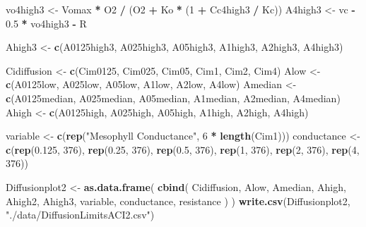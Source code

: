\documentclass[
]{krantz}
\makeatletter
\newenvironment{Shaded}{\begin{snugshade}}{\end{snugshade}}
\newcommand{\DecValTok}[1]{\textcolor[rgb]{0.00,0.00,0.81}{#1}}
\newcommand{\FloatTok}[1]{\textcolor[rgb]{0.00,0.00,0.81}{#1}}
\newcommand{\KeywordTok}[1]{\textcolor[rgb]{0.13,0.29,0.53}{\textbf{#1}}}
\newcommand{\NormalTok}[1]{#1}
\newcommand{\OperatorTok}[1]{\textcolor[rgb]{0.81,0.36,0.00}{\textbf{#1}}}
\newcommand{\StringTok}[1]{\textcolor[rgb]{0.31,0.60,0.02}{#1}}
\newenvironment{kframe}{%
\medskip{}
\setlength{\fboxsep}{.8em}
 \def\at@end@of@kframe{}%
 \ifinner\ifhmode%
  \def\at@end@of@kframe{\end{minipage}}%
  \begin{minipage}{\columnwidth}%
 \fi\fi%
 \def\FrameCommand##1{\hskip\@totalleftmargin \hskip-\fboxsep
 \colorbox{shadecolor}{##1}\hskip-\fboxsep
     \hskip-\linewidth \hskip-\@totalleftmargin \hskip\columnwidth}%
 \MakeFramed {\advance\hsize-\width
   \@totalleftmargin\z@ \linewidth\hsize
   \@setminipage}}%
 {\par\unskip\endMakeFramed%
 \at@end@of@kframe}
\renewenvironment{Shaded}{\begin{kframe}}{\end{kframe}}
\makeatother
\begin{document}
\begin{Shaded}
\begin{Highlighting}[]
\NormalTok{vo4high3 \textless{}{-}}\StringTok{ }\NormalTok{Vomax }\OperatorTok{*}\StringTok{ }\NormalTok{O2 }\OperatorTok{/}\StringTok{ }\NormalTok{(O2 }\OperatorTok{+}\StringTok{ }\NormalTok{Ko }\OperatorTok{*}\StringTok{ }\NormalTok{(}\DecValTok{1} \OperatorTok{+}\StringTok{ }\NormalTok{Cc4high3 }\OperatorTok{/}\StringTok{ }\NormalTok{Kc)) }
\NormalTok{A4high3 \textless{}{-}}\StringTok{ }\NormalTok{vc }\OperatorTok{{-}}\StringTok{ }\FloatTok{0.5} \OperatorTok{*}\StringTok{ }\NormalTok{vo4high3 }\OperatorTok{{-}}\StringTok{ }\NormalTok{R }

\NormalTok{Ahigh3 \textless{}{-}}
\StringTok{  }\KeywordTok{c}\NormalTok{(A0125high3, A025high3, A05high3, A1high3, A2high3, A4high3)}

\NormalTok{Cidiffusion \textless{}{-}}\StringTok{ }\KeywordTok{c}\NormalTok{(Cim0125, Cim025, Cim05, Cim1, Cim2, Cim4)}
\NormalTok{Alow \textless{}{-}}\StringTok{ }\KeywordTok{c}\NormalTok{(A0125low, A025low, A05low, A1low, A2low, A4low)}
\NormalTok{Amedian \textless{}{-}}
\StringTok{  }\KeywordTok{c}\NormalTok{(A0125median,}
\NormalTok{    A025median,}
\NormalTok{    A05median,}
\NormalTok{    A1median,}
\NormalTok{    A2median,}
\NormalTok{    A4median)}
\NormalTok{Ahigh \textless{}{-}}\StringTok{ }\KeywordTok{c}\NormalTok{(A0125high, A025high, A05high, A1high, A2high, A4high)}

\NormalTok{variable \textless{}{-}}\StringTok{ }\KeywordTok{c}\NormalTok{(}\KeywordTok{rep}\NormalTok{(}\StringTok{"Mesophyll Conductance"}\NormalTok{, }\DecValTok{6} \OperatorTok{*}\StringTok{ }\KeywordTok{length}\NormalTok{(Cim1)))}
\NormalTok{conductance \textless{}{-}}
\StringTok{  }\KeywordTok{c}\NormalTok{(}\KeywordTok{rep}\NormalTok{(}\FloatTok{0.125}\NormalTok{, }\DecValTok{376}\NormalTok{),}
    \KeywordTok{rep}\NormalTok{(}\FloatTok{0.25}\NormalTok{, }\DecValTok{376}\NormalTok{),}
    \KeywordTok{rep}\NormalTok{(}\FloatTok{0.5}\NormalTok{, }\DecValTok{376}\NormalTok{),}
    \KeywordTok{rep}\NormalTok{(}\DecValTok{1}\NormalTok{, }\DecValTok{376}\NormalTok{),}
    \KeywordTok{rep}\NormalTok{(}\DecValTok{2}\NormalTok{, }\DecValTok{376}\NormalTok{),}
    \KeywordTok{rep}\NormalTok{(}\DecValTok{4}\NormalTok{, }\DecValTok{376}\NormalTok{))}

\NormalTok{Diffusionplot2 \textless{}{-}}
\StringTok{  }\KeywordTok{as.data.frame}\NormalTok{(}
    \KeywordTok{cbind}\NormalTok{(}
\NormalTok{      Cidiffusion,}
\NormalTok{      Alow,}
\NormalTok{      Amedian,}
\NormalTok{      Ahigh,}
\NormalTok{      Ahigh2,}
\NormalTok{      Ahigh3,}
\NormalTok{      variable,}
\NormalTok{      conductance,}
\NormalTok{      resistance}
\NormalTok{    )}
\NormalTok{  )}
\KeywordTok{write.csv}\NormalTok{(Diffusionplot2, }\StringTok{"./data/DiffusionLimitsACI2.csv"}\NormalTok{)}
\end{Highlighting}
\end{Shaded}
\end{document}
